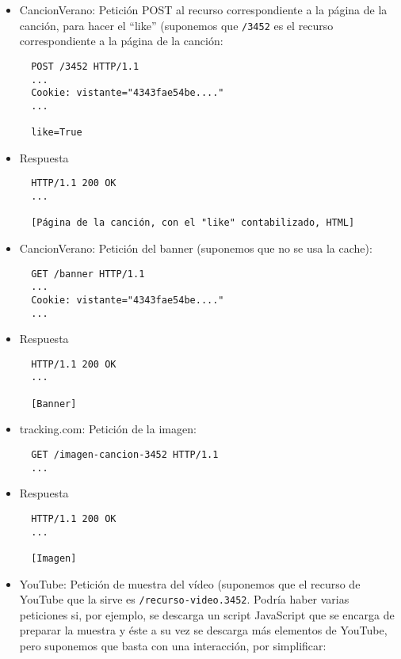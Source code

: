\begin{itemize}

\item CancionVerano: Petición POST al recurso correspondiente a la página de la canción, para hacer el ``like'' (suponemos que \texttt{/3452} es el recurso correspondiente a la página de la canción: 

\begin{verbatim}
  POST /3452 HTTP/1.1
  ...
  Cookie: vistante="4343fae54be...."
  ...

  like=True
\end{verbatim}

\item Respuesta

\begin{verbatim}
  HTTP/1.1 200 OK
  ...

  [Página de la canción, con el "like" contabilizado, HTML]
\end{verbatim}

\item CancionVerano: Petición del banner (suponemos que no se usa la cache):

  \begin{verbatim}
  GET /banner HTTP/1.1
  ...
  Cookie: vistante="4343fae54be...."
  ...
\end{verbatim}

\item Respuesta

\begin{verbatim}
  HTTP/1.1 200 OK
  ...

  [Banner]
\end{verbatim}

\item tracking.com: Petición de la imagen:

  \begin{verbatim}
  GET /imagen-cancion-3452 HTTP/1.1
  ...
\end{verbatim}

\item Respuesta

\begin{verbatim}
  HTTP/1.1 200 OK
  ...

  [Imagen]
\end{verbatim}

\item YouTube: Petición de muestra del vídeo (suponemos que el recurso de YouTube que la sirve es \texttt{/recurso-video.3452}. Podría haber varias peticiones si, por ejemplo, se descarga un script JavaScript que se encarga de preparar la muestra y éste a su vez se descarga más elementos de YouTube, pero suponemos que basta con una interacción, por simplificar:


\end{itemize}
